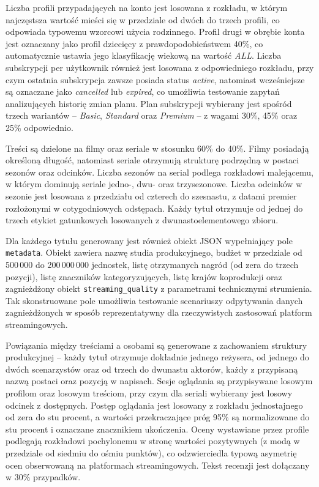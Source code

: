 Liczba profili przypadających na konto jest losowana z rozkładu, w którym
najczęstsza wartość mieści się w przedziale od dwóch do trzech profili,
co odpowiada typowemu wzorcowi użycia rodzinnego. Profil drugi w obrębie
konta jest oznaczany jako profil dziecięcy z prawdopodobieństwem 40\%,
co automatycznie ustawia jego klasyfikację wiekową na wartość \textit{ALL}.
Liczba subskrypcji per użytkownik również jest losowana z odpowiedniego
rozkładu, przy czym ostatnia subskrypcja zawsze posiada status
\textit{active}, natomiast wcześniejsze są oznaczane jako \textit{cancelled}
lub \textit{expired}, co umożliwia testowanie zapytań analizujących historię
zmian planu. Plan subskrypcji wybierany jest spośród trzech wariantów --
\textit{Basic}, \textit{Standard} oraz \textit{Premium} -- z wagami 30\%,
45\% oraz 25\% odpowiednio.

Treści są dzielone na filmy oraz seriale w stosunku 60\% do 40\%. Filmy
posiadają określoną długość, natomiast seriale otrzymują strukturę
podrzędną w postaci sezonów oraz odcinków. Liczba sezonów na serial
podlega rozkładowi malejącemu, w którym dominują seriale jedno-,
dwu- oraz trzysezonowe. Liczba odcinków w sezonie jest losowana
z przedziału od czterech do szesnastu, z datami premier rozłożonymi
w cotygodniowych odstępach. Każdy tytuł otrzymuje od jednej do trzech
etykiet gatunkowych losowanych z dwunastoelementowego zbioru.

Dla każdego tytułu generowany jest również obiekt JSON wypełniający
pole \texttt{metadata}. Obiekt zawiera nazwę studia produkcyjnego,
budżet w przedziale od 500\,000 do 200\,000\,000 jednostek, listę
otrzymanych nagród (od zera do trzech pozycji), listę znaczników
kategoryzujących, listę krajów koprodukcji oraz zagnieżdżony obiekt
\texttt{streaming\_quality} z parametrami technicznymi strumienia.
Tak skonstruowane pole umożliwia testowanie scenariuszy odpytywania
danych zagnieżdżonych w sposób reprezentatywny dla rzeczywistych
zastosowań platform streamingowych.

Powiązania między treściami a osobami są generowane z zachowaniem
struktury produkcyjnej -- każdy tytuł otrzymuje dokładnie jednego
reżysera, od jednego do dwóch scenarzystów oraz od trzech do dwunastu
aktorów, każdy z przypisaną nazwą postaci oraz pozycją w napisach.
Sesje oglądania są przypisywane losowym profilom oraz losowym treściom,
przy czym dla seriali wybierany jest losowy odcinek z dostępnych. Postęp
oglądania jest losowany z rozkładu jednostajnego od zera do stu procent,
a wartości przekraczające próg 95\% są normalizowane do stu procent
i oznaczane znacznikiem ukończenia. Oceny wystawiane przez profile
podlegają rozkładowi pochylonemu w stronę wartości pozytywnych
(z modą w przedziale od siedmiu do ośmiu punktów), co odzwierciedla
typową asymetrię ocen obserwowaną na platformach streamingowych.
Tekst recenzji jest dołączany w 30\% przypadków.

